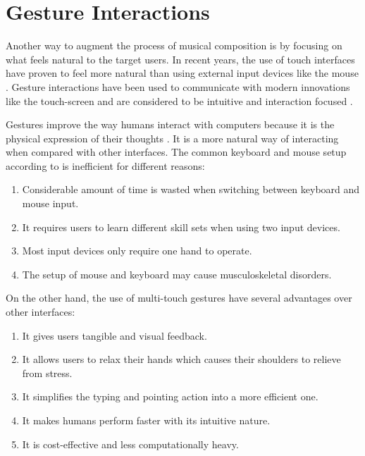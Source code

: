 \section{Gesture Interactions}

Another way to augment the process of musical composition is by focusing on what feels natural to the target users. In recent years, the use of touch interfaces have proven to feel more natural than using external input devices like the mouse \citep{travis2014comparative}. Gesture interactions have been used to communicate with modern innovations like the touch-screen and are considered to be intuitive and interaction focused \citep{epps2006a,kammer2010towards}. 

Gestures improve the way humans interact with computers because it is the physical expression of their thoughts \citep{westerman2001multi}. It is a more natural way of interacting when compared with other interfaces. The common keyboard and mouse setup according to \citet{westerman2001multi} is inefficient for different reasons:

\begin{enumerate}[label=(\alph*)]
  \item Considerable amount of time is wasted when switching between keyboard and mouse input.
  \item It requires users to learn different skill sets when using two input devices.
  \item Most input devices only require one hand to operate.
  \item The setup of mouse and keyboard may cause musculoskeletal disorders.
\end{enumerate}

On the other hand, the use of multi-touch gestures have several advantages over other interfaces: 

\begin{enumerate}[label=(\alph*)]
  \item It gives users tangible and visual feedback.
  \item It allows users to relax their hands which causes their shoulders to relieve from stress.
  \item It simplifies the typing and pointing action into a more efficient one.
  \item It makes humans perform faster with its intuitive nature.
  \item It is cost-effective and less computationally heavy.
\end{enumerate}


